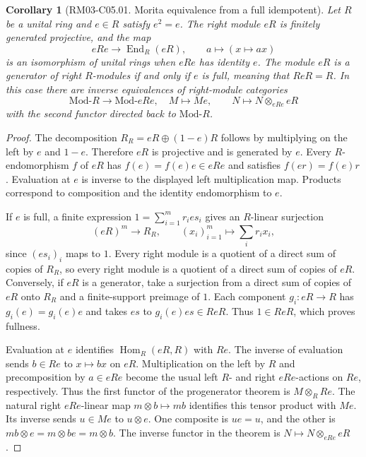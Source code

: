 \documentclass[11pt,oneside,openany]{book}
\newtheorem{corollary}[theorem]{Corollary}
\theoremstyle{definition}
\theoremstyle{remark}
\begin{document}
\begin{corollary}[RM03-C05.01. Morita equivalence from a full idempotent]
\label{cor:rm03-full-corner}
Let \(R\) be a unital ring and \(e\in R\) satisfy \(e^2=e\). The
right module \(eR\) is finitely generated projective, and the map
\[
   eRe\longrightarrow\operatorname{End}_R(eR),\qquad
   a\longmapsto (x\longmapsto ax)
\]
is an isomorphism of unital rings when \(eRe\) has identity \(e\).
The module \(eR\) is a generator of right \(R\)-modules if and only if
\(e\) is full, meaning that \(ReR=R\). In this case there are inverse
equivalences of right-module categories
\[
   \mathrm{Mod}\text{-}R \longrightarrow \mathrm{Mod}\text{-}eRe,
   \quad M\longmapsto Me,
   \qquad
   N\longmapsto N\otimes_{eRe}eR
\]
with the second functor directed back to \(\mathrm{Mod}\text{-}R\).
\end{corollary}
\begin{proof}
The decomposition \(R_R=eR\oplus(1-e)R\) follows by multiplying on
the left by \(e\) and \(1-e\). Therefore \(eR\) is projective and is
generated by \(e\). Every \(R\)-endomorphism \(f\) of \(eR\) has
\(f(e)=f(e)e\in eRe\) and satisfies \(f(er)=f(e)r\). Evaluation at
\(e\) is inverse to the displayed left multiplication map. Products
correspond to composition and the identity endomorphism to \(e\).

If \(e\) is full, a finite expression
\(1=\sum_{i=1}^m r_i e s_i\) gives an \(R\)-linear surjection
\[
    (eR)^m\longrightarrow R_R,\qquad
    (x_i)_{i=1}^m\longmapsto\sum_i r_i x_i,
\]
since \((e s_i)_i\) maps to \(1\). Every right module is a quotient
of a direct sum of copies of \(R_R\), so every right module is a
quotient of a direct sum of copies of \(eR\). Conversely, if \(eR\)
is a generator, take a surjection from a direct sum of copies of
\(eR\) onto \(R_R\) and a finite-support preimage of \(1\). Each
component \(g_i:eR\to R\) has \(g_i(e)=g_i(e)e\) and takes \(e s\)
to \(g_i(e)e s\in ReR\). Thus \(1\in ReR\), which proves fullness.

Evaluation at \(e\) identifies \(\operatorname{Hom}_R(eR,R)\)
with \(Re\). The inverse of evaluation sends \(b\in Re\) to
\(x\mapsto bx\) on \(eR\). Multiplication on the left by \(R\)
and precomposition by \(a\in eRe\) become the usual left \(R\)- and
right \(eRe\)-actions on \(Re\), respectively. Thus the first
functor of the progenerator theorem is \(M\otimes_R Re\).
The natural right \(eRe\)-linear map \(m\otimes b\mapsto mb\)
identifies this tensor product with \(Me\). Its inverse sends
\(u\in Me\) to \(u\otimes e\). One composite is \(ue=u\), and
the other is \(mb\otimes e=m\otimes be=m\otimes b\).
The inverse functor in the theorem is \(N\mapsto N\otimes_{eRe}eR\).
\end{proof}
\end{document}
